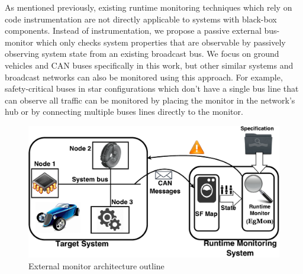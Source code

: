 
As mentioned previously, existing runtime monitoring techniques which rely on code instrumentation are not directly applicable to systems with black-box components.
Instead of instrumentation, we propose a passive external bus-monitor which only checks system properties that are observable by passively observing system state from an existing broadcast bus.
We focus on ground vehicles and CAN buses specifically in this work, but other similar systems and broadcast networks can also be monitored using this approach.
For example, safety-critical buses in star configurations which don't have a single bus line that can observe all traffic can be monitored by placing the monitor in the network's hub or by connecting multiple buses lines directly to the monitor. 

\begin{figure}[!h]
\includegraphics[scale=0.5]{img/ARV-main.pdf}
\caption{External monitor architecture outline \label{fig:architecture}}
\end{figure}


